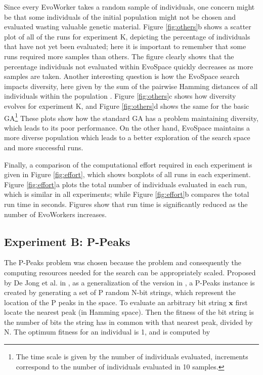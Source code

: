 Since every EvoWorker takes a random sample of individuals, one concern might be that some individuals of the initial population might
not be chosen and evaluated wasting valuable genetic material.
Figure \ref{fig:others}b shows a scatter plot of all of the runs for experiment K, depicting the percentage of individuals
that have not yet been evaluated; here it is important to remember that some runs required more samples than others.
The figure clearly shows that the percentage individuals not evaluated within EvoSpace quickly decreases as more samples are taken.
Another interesting question is how the EvoSpace search impacts diversity, here given by the sum of the pairwise Hamming distances
of all individuals within the population \cite{diversity}.
Figure \ref{fig:others}c shows how diversity evolves for experiment K, and
Figure \ref{fig:others}d shows the same for the basic GA\footnote{The time scale is given by
the number of individuals evaluated, increments correspond to the number of individuals evaluated in 10 samples.}
These plots show how the standard GA has a problem maintaining diversity, which leads to its poor performance.
On the other hand, EvoSpace maintains a more diverse population which leads to a better exploration of the search space and more successful runs.

Finally, a comparison of the computational effort required in each experiment is given in
Figure \ref{fig:effort}, which shows boxplots of all runs in each experiment.
Figure \ref{fig:effort}a plots the total number of individuals evaluated in each run, which is similar in all experiments;
while Figure \ref{fig:effort}b compares the total run time in seconds.
Figures show that run time is significantly reduced as the number of EvoWorkers increases.



\subsection{Experiment B: P-Peaks}

The P-Peaks problem was chosen because the problem and consequently the computing resources needed for the search can be appropriately scaled.
Proposed by De Jong et al. in \cite{Jong:PS97}, as a generalization of the version in \cite{Jong:1990}, a
P-Peaks instance is created by generating a set of P random N-bit
strings, which represent the location of the P peaks in the space. To
evaluate an arbitrary bit string \begin{math} \mathbf{x} \end{math}
first locate the nearest peak (in Hamming space). Then the fitness of
the bit string is the number of bits the string has in common with
that nearest peak, divided by N. The optimum fitness for an individual
is 1, and is computed by

